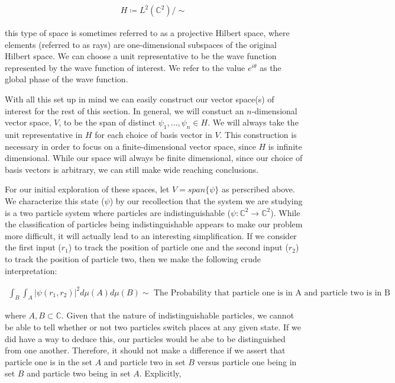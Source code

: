 \documentclass[10pt]{ucthesis}
\newcommand{\C}{\mathbb{C}}
\begin{document}
\begin{equation}
	\begin{aligned}
		H \coloneq L^2(\C^2)/\sim
	\end{aligned}
\end{equation}

this type of space is sometimes referred to as a projective Hilbert space, where elements (referred to as rays) are one-dimensional subspaces of the original Hilbert space. We can choose a unit representative to be the wave function represented by the wave function of interest. We refer to the value $e^{i\theta}$ as the global phase of the wave function.

With all this set up in mind we can easily construct our vector space(s) of interest for the rest of this section. In general, we will constuct an $n$-dimensional vector space, $V$, to be the span of distinct $\psi_1,\hdots,\psi_n\in H$. We will always take the unit representative in $H$ for each choice of basis vector in $V$. This construction is necessary in order to focus on a finite-dimensional vector space, since $H$ is infinite dimensional. While our space will always be finite dimensional, since our choice of basis vectors is arbitrary, we can still make wide reaching conclusions. 

For our initial exploration of these spaces, let $V = span\{\psi\}$ as perscribed above. We characterize this state ($\psi$) by our recollection that the system we are studying is a two particle system where particles are indistinguishable ($\psi:\C^2\rightarrow\C^2$). While the classification of particles being indistinguishable appears to make our problem more difficult, it will actually lead to an interesting simplification. If we consider the first input ($r_1$) to track the position of particle one and the second input ($r_2$) to track the position of particle two, then we make the following crude interpretation:

\begin{equation}
	\begin{aligned}
		\int_B \int_A |\psi(r_1,r_2)|^2 d\mu(A)d\mu(B) \sim \text{ The Probability that particle one is in A and particle two is in B}
	\end{aligned}
\end{equation}

where $A,B\subset\C$. Given that the nature of indistinguishable particles, we cannot be able to tell whether or not two particles switch places at any given state. If we did have a way to deduce this, our particles would be abe to be distinguished from one another. Therefore, it should not make a difference if we assert that particle one is in the set $A$ and particle two in set $B$ versus particle one being in set $B$ and particle two being in set $A$. Explicitly,
\end{document}
